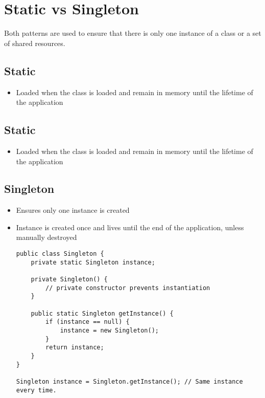 \chapter{Static vs Singleton}

Both patterns are used to ensure that there is only one instance of a class or a set of shared resources.

\section{Static}
\begin{itemize}
    \item Loaded when the class is loaded and remain in memory until the lifetime of the application
\end{itemize}

\section{Static}
\begin{itemize}
    \item Loaded when the class is loaded and remain in memory until the lifetime of the application
\end{itemize}

\section{Singleton}
\begin{itemize}
    \item Ensures only one instance is created
    \item Instance is created once and lives until the end of the application, unless manually destroyed

    \begin{lstlisting}
public class Singleton {
    private static Singleton instance;
    
    private Singleton() {
        // private constructor prevents instantiation
    }
    
    public static Singleton getInstance() {
        if (instance == null) {
            instance = new Singleton();
        }
        return instance;
    }
}

Singleton instance = Singleton.getInstance(); // Same instance every time.

    \end{lstlisting}
\end{itemize}

